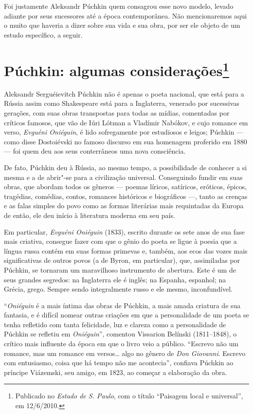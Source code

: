Foi justamente Aleksandr Púchkin quem consagrou esse novo modelo, levado
adiante por seus sucessores até a época contemporânea. Não mencionaremos
aqui o muito que haveria a dizer sobre sua vida e sua obra, por ser ele
objeto de um estudo específico, a seguir.

\chapter{Púchkin: algumas considerações\footnote{Publicado no \emph{Estado de S. Paulo}, com o título ``Paisagem local e universal'', em 12/6/2010.}}

Aleksandr Serguéievitch Púchkin não é apenas o poeta nacional, que está
para a Rússia assim como Shakespeare está para a Inglaterra, venerado
por sucessivas gerações, com suas obras transpostas para todas as
mídias, comentadas por críticos famosos, que vão de Iúri Lótman a
Vladímir Nabókov, e cujo romance em verso, \emph{Evguéni Oniéguin}, é lido
sofregamente por estudiosos e leigos; Púchkin --- como disse
Dostoiévski no famoso discurso em sua homenagem proferido em 1880 --- foi quem deu aos seus conterrâneos uma nova consciência.

De fato, Púchkin deu à Rússia, ao mesmo tempo, a possibilidade de
conhecer a si mesma e a de abrir"-se para a civilização universal.
Conseguindo fundir em suas obras, que abordam todos os gêneros --- poemas
líricos, satíricos, eróticos, épicos, tragédias, comédias, contos,
romances históricos e biográficos ---, tanto as crenças e as falas simples
do povo como as formas literárias mais requintadas da Europa de então,
ele deu início à literatura moderna em seu país.

Em particular, \emph{Evguéni Oniéguin} (1833), escrito durante os
sete anos de sua fase mais criativa, consegue fazer com que o gênio do poeta se ligue à poesia
que a língua russa contém em suas formas primevas e, também, aos ecos das
vozes mais significativas de outros povos (a de Byron, em particular),
que, assimiladas por Púchkin, se tornaram um maravilhoso instrumento de
abertura. Este é um de seus grandes segredos: na Inglaterra ele é
inglês; na Espanha, espanhol; na Grécia, grego. Sempre sendo
integralmente russo e ele mesmo, inconfundível.

``\emph{Oniéguin} é a mais íntima das obras de Púchkin, a mais amada criatura de
sua fantasia, e é difícil nomear outras criações em que a personalidade
de um poeta se tenha refletido com tanta felicidade, luz e clareza como
a personalidade de Púchkin se refletiu em \emph{Oniéguin}'', comentou Vissarion
Belínski (1811--1848), o crítico mais influente da época em que o livro veio a
público. ``Escrevo não um romance, mas um romance em versos\ldots{} algo no
gênero de \emph{Don Giovanni}. Escrevo com entusiasmo, coisa que há tempo não
me acontecia'', confiava Púchkin ao príncipe Viázemski, seu amigo, em
1823, ao começar a elaboração da obra.

